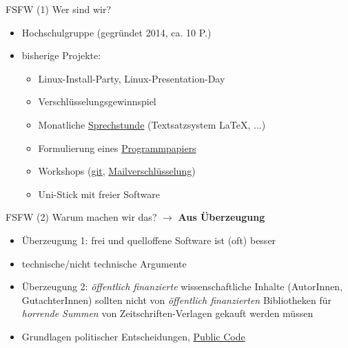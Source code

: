 \documentclass[t]{beamer}
\begin{document}
\begin{frame}[label=ct1]{\color{fg}FSFW (1)}
Wer sind wir?
  \begin{itemize}
  \item Hochschulgruppe (gegründet 2014, ca. 10 P.)
  \item bisherige Projekte:
  \begin{itemize}
   \item Linux-Install-Party, Linux-Presentation-Day
   \item Verschlüsselungsgewinnspiel
   \item Monatliche \href{https://fsfw-dresden.de/sprechstunde}{Sprechstunde} (Textsatzsystem \LaTeX, ...)
   \item Formulierung eines \href{https://fsfw-dresden.de/programm}{Programmpapiers}
   \item Workshops (\href{https://fsfw-dresden.de/git-ws}{git}, \href{https://fsfw-dresden.de/gpg}{Mailverschlüsselung})
   \item Uni-Stick mit freier Software
  \end{itemize}
  \end{itemize}  
\end{frame}


\begin{frame}[label=ct2]{\color{fg}FSFW (2)}
Warum machen wir das? $\rightarrow$ \textbf{Aus Überzeugung}\\[1cm]
  \begin{itemize}
  \item Überzeugung 1: frei und quelloffene Software ist (oft) besser
  \item[] technische/nicht technische Argumente
  \pause
  \bigskip
  \item Überzeugung 2: \textit{öffentlich finanzierte} wissenschaftliche Inhalte
  (AutorInnen, GutachterInnen) sollten nicht von \textit{öffentlich finanzierten}
  Bibliotheken für \textit{horrende Summen} von Zeitschriften-Verlagen gekauft werden müssen
  \item[] Grundlagen politischer Entscheidungen, \href{https://publiccode.eu/}{Public Code}
  \end{itemize}  
\end{frame}
\end{document}
